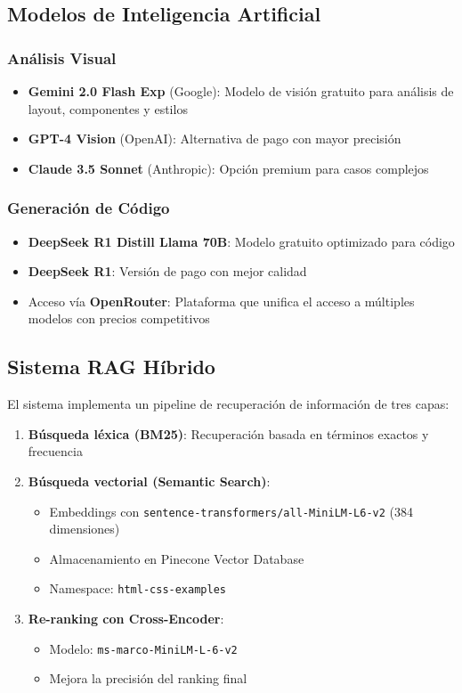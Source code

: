 \documentclass[12pt,a4paper]{article}
\begin{document}
\subsection{Modelos de Inteligencia Artificial}

\subsubsection{Análisis Visual}
\begin{itemize}
    \item \textbf{Gemini 2.0 Flash Exp} (Google): Modelo de visión gratuito para análisis de layout, componentes y estilos
    \item \textbf{GPT-4 Vision} (OpenAI): Alternativa de pago con mayor precisión
    \item \textbf{Claude 3.5 Sonnet} (Anthropic): Opción premium para casos complejos
\end{itemize}

\subsubsection{Generación de Código}
\begin{itemize}
    \item \textbf{DeepSeek R1 Distill Llama 70B}: Modelo gratuito optimizado para código
    \item \textbf{DeepSeek R1}: Versión de pago con mejor calidad
    \item Acceso vía \textbf{OpenRouter}: Plataforma que unifica el acceso a múltiples modelos con precios competitivos
\end{itemize}

\subsection{Sistema RAG Híbrido}

El sistema implementa un pipeline de recuperación de información de tres capas:

\begin{enumerate}
    \item \textbf{Búsqueda léxica (BM25)}: Recuperación basada en términos exactos y frecuencia
    \item \textbf{Búsqueda vectorial (Semantic Search)}: 
    \begin{itemize}
        \item Embeddings con \texttt{sentence-transformers/all-MiniLM-L6-v2} (384 dimensiones)
        \item Almacenamiento en Pinecone Vector Database
        \item Namespace: \texttt{html-css-examples}
    \end{itemize}
    \item \textbf{Re-ranking con Cross-Encoder}:
    \begin{itemize}
        \item Modelo: \texttt{ms-marco-MiniLM-L-6-v2}
        \item Mejora la precisión del ranking final
    \end{itemize}
\end{enumerate}
\end{document}
